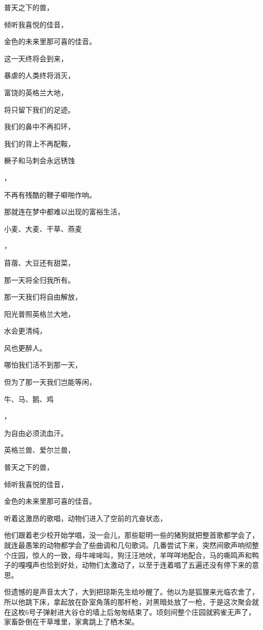 普天之下的兽，

倾听我喜悦的佳音，

金色的未来里那可喜的佳音。

这一天终将会到来，

暴虐的人类终将消灭，

富饶的英格兰大地，

将只留下我们的足迹。

我们的鼻中不再扣环，

我们的背上不再配鞍，

橛子和马刺会永远锈蚀

，

不再有残酷的鞭子噼啪作响。

那就连在梦中都难以出现的富裕生活，

小麦、大麦、干草、燕麦

，

苜蓿、大豆还有甜菜，

那一天将全归我所有。

那一天我们将自由解放，

阳光普照英格兰大地，

水会更清纯，

风也更醉人。

哪怕我们活不到那一天，

但为了那一天我们岂能等闲，

牛、马、鹅、鸡

，

为自由必须流血汗。

英格兰兽、爱尔兰兽，

普天之下的兽，

倾听我喜悦的佳音，

金色的未来里那可喜的佳音。

听着这激昂的歌唱，动物们进入了空前的亢奋状态，

他们跟着老少校开始学唱，没一会儿，那些聪明一些的猪狗就把整首歌都学会了，就连最愚笨的动物都学会了些曲调和几句歌词。几番尝试下来，突然间歌声响彻整个庄园，惊人的一致，母牛哞哞叫，狗汪汪地吠，羊咩咩地配合，马的嘶鸣声和鸭子的嘎嘎声也恰到好处，动物们太激动了，以至于连着唱了五遍还没有停下来的意思。

但遗憾的是声音太大了，大到把琼斯先生给吵醒了。他以为是狐狸来光临农舍了，所以他跳下床，拿起放在卧室角落的那杆枪，对黑暗处放了一枪，于是这次聚会就在这枚6号子弹射进大谷仓的墙上后匆匆结束了。顷刻间整个庄园就鸦雀无声了，家畜卧倒在干草堆里，家禽跳上了栖木架。
